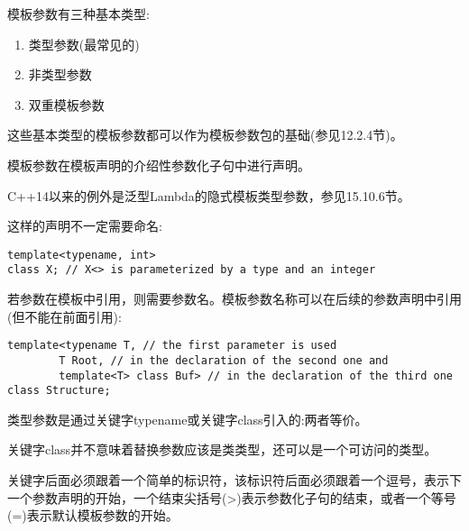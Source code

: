 
模板参数有三种基本类型:

\begin{enumerate}
\item 
类型参数(最常见的)

\item 
非类型参数

\item 
双重模板参数
\end{enumerate}	

这些基本类型的模板参数都可以作为模板参数包的基础(参见12.2.4节)。

模板参数在模板声明的介绍性参数化子句中进行声明。

\begin{tcolorbox}[colback=webgreen!5!white,colframe=webgreen!75!black]
\hspace*{0.75cm}C++14以来的例外是泛型Lambda的隐式模板类型参数，参见15.10.6节。
\end{tcolorbox}

这样的声明不一定需要命名:

\begin{lstlisting}[style=styleCXX]
template<typename, int>
class X; // X<> is parameterized by a type and an integer
\end{lstlisting}

若参数在模板中引用，则需要参数名。模板参数名称可以在后续的参数声明中引用(但不能在前面引用):

\begin{lstlisting}[style=styleCXX]
template<typename T, // the first parameter is used
		T Root, // in the declaration of the second one and
		template<T> class Buf> // in the declaration of the third one
class Structure;
\end{lstlisting}


类型参数是通过关键字typename或关键字class引入的:两者等价。

\begin{tcolorbox}[colback=webgreen!5!white,colframe=webgreen!75!black]
\hspace*{0.75cm}关键字class并不意味着替换参数应该是类类型，还可以是一个可访问的类型。
\end{tcolorbox}

关键字后面必须跟着一个简单的标识符，该标识符后面必须跟着一个逗号，表示下一个参数声明的开始，一个结束尖括号(>)表示参数化子句的结束，或者一个等号(=)表示默认模板参数的开始。

